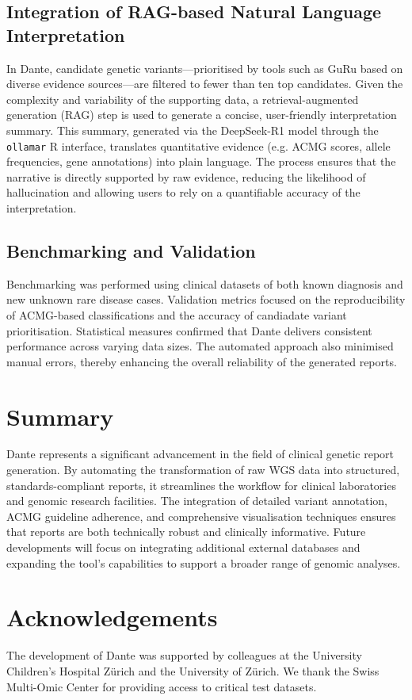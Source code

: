 \subsection{Integration of RAG-based Natural Language Interpretation}
\noindent
In Dante, candidate genetic variants—prioritised by tools such as GuRu based on diverse evidence sources—are filtered to fewer than ten top candidates. Given the complexity and variability of the supporting data, a retrieval-augmented generation (RAG) step is used to generate a concise, user-friendly interpretation summary. This summary, generated via the DeepSeek-R1 model through the \texttt{ollamar} R interface, translates quantitative evidence (e.g. ACMG scores, allele frequencies, gene annotations) into plain language. The process ensures that the narrative is directly supported by raw evidence, reducing the likelihood of hallucination and allowing users to rely on a quantifiable accuracy of the interpretation.


\subsection{Benchmarking and Validation}
\noindent
Benchmarking was performed using  clinical datasets of both known diagnosis and new unknown rare disease cases. Validation metrics focused on the reproducibility of ACMG-based classifications and the accuracy of candiadate variant prioritisation. Statistical measures confirmed that Dante delivers consistent performance across varying data sizes. The automated approach also minimised manual errors, thereby enhancing the overall reliability of the generated reports.

\section{Summary}
\noindent
Dante represents a significant advancement in the field of clinical genetic report generation. By automating the transformation of raw WGS data into structured, standards-compliant reports, it streamlines the workflow for clinical laboratories and genomic research facilities. The integration of detailed variant annotation, ACMG guideline adherence, and comprehensive visualisation techniques ensures that reports are both technically robust and clinically informative. Future developments will focus on integrating additional external databases and expanding the tool’s capabilities to support a broader range of genomic analyses.

\section*{Acknowledgements}
\noindent
The development of Dante was supported by colleagues at the University Children's Hospital Zürich and the University of Zürich. We thank the Swiss Multi-Omic Center for providing access to critical test datasets.

